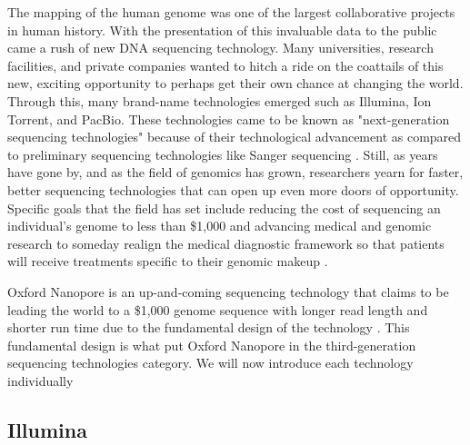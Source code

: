 \documentclass[12pt,letterpaper]{report}
\begin{document}
The mapping of the human genome was one of the largest collaborative projects in human history. With the presentation of this invaluable data to the public came a rush of new DNA sequencing technology. Many universities, research facilities, and private companies wanted to hitch a ride on the coattails of this new, exciting opportunity to perhaps get their own chance at changing the world. Through this, many brand-name technologies emerged such as Illumina, Ion Torrent, and PacBio. These technologies came to be known as "next-generation sequencing technologies" because of their technological advancement as compared to preliminary sequencing technologies like Sanger sequencing \cite{Shendure}. Still, as years have gone by, and as the field of genomics has grown, researchers yearn for faster, better sequencing technologies that can open up even more doors of opportunity. Specific goals that the field has set include reducing the cost of sequencing an individual's genome to less than \$1,000 and advancing medical and genomic research to someday realign the medical diagnostic framework so that patients will receive treatments specific to their genomic makeup \cite{Salto-Tellez}.

Oxford Nanopore is an up-and-coming sequencing technology that claims to be leading the world to a \$1,000 genome sequence with longer read length and shorter run time due to the fundamental design of the technology \cite{Maitra}. This fundamental design is what put Oxford Nanopore in the third-generation sequencing technologies category. We will now introduce each technology individually
	
\subsection{Illumina}
\end{document}
